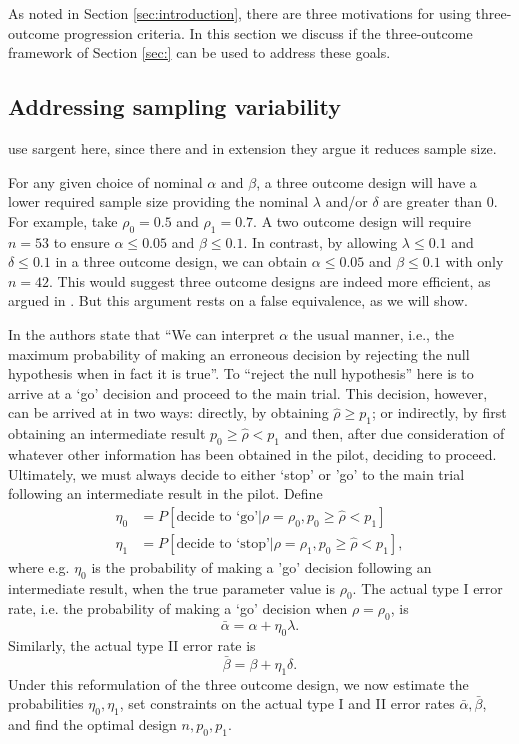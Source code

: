 \documentclass[sagev, Crown]{sagej} %
\begin{document}
As noted in Section \ref{sec:introduction}, there are three motivations for using three-outcome progression criteria. In this section we discuss if the three-outcome framework of Section \ref{sec:} can be used to address these goals.

\subsection{Addressing sampling variability}

use sargent here, since there and in extension they argue it reduces sample size.

For any given choice of nominal $\alpha$ and $\beta$, a three outcome design will have a lower required sample size providing the nominal $\lambda$ and/or $\delta$ are greater than 0. For example, take $\rho_0 = 0.5$ and $\rho_1 = 0.7$. A two outcome design will require $n = 53$ to ensure $\alpha \leq 0.05$ and $\beta \leq 0.1$. In contrast, by allowing $\lambda \leq 0.1$ and $\delta \leq 0.1$ in a three outcome design, we can obtain $\alpha \leq 0.05$ and $\beta \leq 0.1$ with only $n = 42$. This would suggest three outcome designs are indeed more efficient, as argued in \cite{Hong2007}. But this argument rests on a false equivalence, as we will show.

In \cite{Sargent2001} the authors state that ``We  can interpret $\alpha$  the usual  manner,  i.e., the  maximum probability of making an erroneous decision by rejecting the null hypothesis when in fact it is true''. To ``reject the null hypothesis'' here is to arrive at a `go' decision and proceed to the main trial. This decision, however, can be arrived at in two ways: directly, by obtaining $\hat{\rho} \geq p_1$; or indirectly, by first obtaining an intermediate result $p_0 \geq \hat{\rho} < p_1$ and then, after due consideration of whatever other information has been obtained in the pilot, deciding to proceed. Ultimately, we must always decide to either `stop' or 'go' to the main trial following an intermediate result in the pilot. Define
\begin{align}
\eta_0 &= P[\text{decide to `go'} | \rho = \rho_0, p_0 \geq \hat{\rho} < p_1] \\
\eta_1 &= P[\text{decide to `stop'} | \rho = \rho_1, p_0 \geq \hat{\rho} < p_1],
\end{align}
where e.g.  $\eta_0$ is the probability of making a 'go' decision following an intermediate result, when the true parameter value is $\rho_0$. The actual type I error rate, i.e. the probability of making a `go' decision when $\rho = \rho_0$, is
$$
\bar{\alpha} = \alpha + \eta_0 \lambda.
$$
Similarly, the actual type II error rate is
$$
\bar{\beta} = \beta + \eta_1 \delta.
$$
Under this reformulation of the three outcome design, we now estimate the probabilities $\eta_0, \eta_1$, set constraints on the actual type I and II error rates $\bar{\alpha}, \bar{\beta}$, and find the optimal design $n, p_0, p_1$. 
\end{document}
